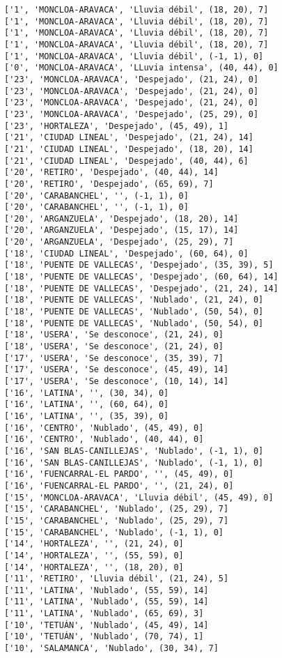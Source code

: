 \documentclass[11pt]{article}
\begin{document}
\begin{Verbatim}[commandchars=\\\{\}]
['1', 'MONCLOA-ARAVACA', 'Lluvia débil', (18, 20), 7]
['1', 'MONCLOA-ARAVACA', 'Lluvia débil', (18, 20), 7]
['1', 'MONCLOA-ARAVACA', 'Lluvia débil', (18, 20), 7]
['1', 'MONCLOA-ARAVACA', 'Lluvia débil', (18, 20), 7]
['1', 'MONCLOA-ARAVACA', 'Lluvia débil', (-1, 1), 0]
['0', 'MONCLOA-ARAVACA', 'LLuvia intensa', (40, 44), 0]
['23', 'MONCLOA-ARAVACA', 'Despejado', (21, 24), 0]
['23', 'MONCLOA-ARAVACA', 'Despejado', (21, 24), 0]
['23', 'MONCLOA-ARAVACA', 'Despejado', (21, 24), 0]
['23', 'MONCLOA-ARAVACA', 'Despejado', (25, 29), 0]
['23', 'HORTALEZA', 'Despejado', (45, 49), 1]
['21', 'CIUDAD LINEAL', 'Despejado', (21, 24), 14]
['21', 'CIUDAD LINEAL', 'Despejado', (18, 20), 14]
['21', 'CIUDAD LINEAL', 'Despejado', (40, 44), 6]
['20', 'RETIRO', 'Despejado', (40, 44), 14]
['20', 'RETIRO', 'Despejado', (65, 69), 7]
['20', 'CARABANCHEL', '', (-1, 1), 0]
['20', 'CARABANCHEL', '', (-1, 1), 0]
['20', 'ARGANZUELA', 'Despejado', (18, 20), 14]
['20', 'ARGANZUELA', 'Despejado', (15, 17), 14]
['20', 'ARGANZUELA', 'Despejado', (25, 29), 7]
['18', 'CIUDAD LINEAL', 'Despejado', (60, 64), 0]
['18', 'PUENTE DE VALLECAS', 'Despejado', (35, 39), 5]
['18', 'PUENTE DE VALLECAS', 'Despejado', (60, 64), 14]
['18', 'PUENTE DE VALLECAS', 'Despejado', (21, 24), 14]
['18', 'PUENTE DE VALLECAS', 'Nublado', (21, 24), 0]
['18', 'PUENTE DE VALLECAS', 'Nublado', (50, 54), 0]
['18', 'PUENTE DE VALLECAS', 'Nublado', (50, 54), 0]
['18', 'USERA', 'Se desconoce', (21, 24), 0]
['18', 'USERA', 'Se desconoce', (21, 24), 0]
['17', 'USERA', 'Se desconoce', (35, 39), 7]
['17', 'USERA', 'Se desconoce', (45, 49), 14]
['17', 'USERA', 'Se desconoce', (10, 14), 14]
['16', 'LATINA', '', (30, 34), 0]
['16', 'LATINA', '', (60, 64), 0]
['16', 'LATINA', '', (35, 39), 0]
['16', 'CENTRO', 'Nublado', (45, 49), 0]
['16', 'CENTRO', 'Nublado', (40, 44), 0]
['16', 'SAN BLAS-CANILLEJAS', 'Nublado', (-1, 1), 0]
['16', 'SAN BLAS-CANILLEJAS', 'Nublado', (-1, 1), 0]
['16', 'FUENCARRAL-EL PARDO', '', (45, 49), 0]
['16', 'FUENCARRAL-EL PARDO', '', (21, 24), 0]
['15', 'MONCLOA-ARAVACA', 'Lluvia débil', (45, 49), 0]
['15', 'CARABANCHEL', 'Nublado', (25, 29), 7]
['15', 'CARABANCHEL', 'Nublado', (25, 29), 7]
['15', 'CARABANCHEL', 'Nublado', (-1, 1), 0]
['14', 'HORTALEZA', '', (21, 24), 0]
['14', 'HORTALEZA', '', (55, 59), 0]
['14', 'HORTALEZA', '', (18, 20), 0]
['11', 'RETIRO', 'Lluvia débil', (21, 24), 5]
['11', 'LATINA', 'Nublado', (55, 59), 14]
['11', 'LATINA', 'Nublado', (55, 59), 14]
['11', 'LATINA', 'Nublado', (65, 69), 3]
['10', 'TETUÁN', 'Nublado', (45, 49), 14]
['10', 'TETUÁN', 'Nublado', (70, 74), 1]
['10', 'SALAMANCA', 'Nublado', (30, 34), 7]

\end{Verbatim}
\end{document}
